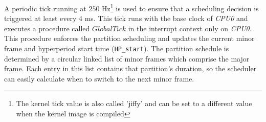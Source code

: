  A periodic tick running at $250$ Hz\footnote{The kernel tick value is also called 'jiffy' and can be set to a different value when the kernel image is compiled}  is used to ensure
that a scheduling decision is triggered at least every $4$ ms.  This
tick runs with the base clock of \emph{CPU0} and executes a procedure called $GlobalTick$
in the interrupt context only on
\emph{CPU0}.   
 This procedure enforces the partition scheduling and
updates the current minor frame and hyperperiod start time
(\texttt{HP\_start}).  The partition schedule is determined by
a circular linked list of minor frames which comprise
the major frame.  Each entry in this list contains that partition's duration,
so the scheduler can easily calculate when to switch to the next minor frame. 


  \iffalse

\begin{algorithm}[t]
\caption{Global Tick}
\label{algo:globaltick}
\begin{algorithmic}[1]
\footnotesize
\IF{ \COMMENT{Current CPU is CPU0}}
\IF {$firstrun ~and~mfl \neq null $} 
\STATE  $ firstrun \leftarrow false$
\STATE  $ HP\_start \leftarrow Sched\_clock()$\COMMENT{ Sched\_clock() provides the current uptime measured based on elapsed jiffies}
\STATE  $ MF\_start \leftarrow  HP\_start$
\STATE  $ cur\_frame \leftarrow HEAD(mfl)$
\STATE  $next\_switch \leftarrow HP\_start+cur\_frame.duration$
\ENDIF
\IF {$Sched\_clock() \geq next\_switch$ } 
\STATE  $ cur\_frame \leftarrow cur\_frame.next$
\STATE  $next\_switch \leftarrow next\_switch+cur\_frame.duration$
\IF {$cur\_frame ==  HEAD(mfl)$ } 
\STATE $ HP\_start \leftarrow Sched\_clock()$
\ENDIF
\ENDIF
\ENDIF
\end{algorithmic}
\end{algorithm}
\fi

